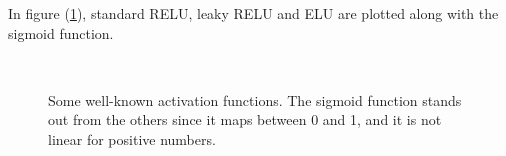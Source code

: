 In figure (\ref{fig:activation_functions}), standard RELU, leaky RELU and ELU are plotted along with the sigmoid function.

\begin{figure}
	\centering
	\\
	
	\caption{Some well-known activation functions. The sigmoid function stands out from the others since it maps between 0 and 1, and it is not linear for positive numbers.}%
	\label{fig:activation_functions}%
\end{figure}


